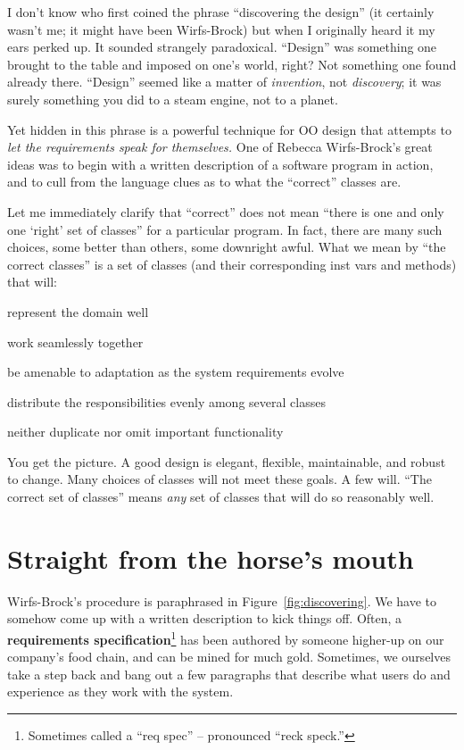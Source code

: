 I don't know who first coined the phrase ``discovering the design'' (it
certainly wasn't me; it might have been Wirfs-Brock) but when I originally
heard it my ears perked up. It sounded strangely paradoxical. ``Design'' was
something one brought to the table and imposed on one's world, right? Not
something one found already there. ``Design'' seemed like a matter of
\textit{invention}, not \textit{discovery}; it was surely something you did to
a steam engine, not to a planet.

Yet hidden in this phrase is a powerful technique for OO design that attempts
to \textit{let the requirements speak for themselves.} One of Rebecca
Wirfs-Brock's great ideas was to begin with a written description of a
software program in action, and to cull from the language clues as to what the
``correct'' classes are.

Let me immediately clarify that ``correct'' does not mean ``there is one and
only one `right' set of classes'' for a particular program. In fact, there are
many such choices, some better than others, some downright awful. What we
mean by ``the correct classes'' is a set of classes (and their corresponding
inst vars and methods) that will:

\begin{compactitem}
\item represent the domain well
\item work seamlessly together
\item be amenable to adaptation as the system requirements evolve
\item distribute the responsibilities evenly among several classes
\item neither duplicate nor omit important functionality
\end{compactitem}

You get the picture. A good design is elegant, flexible, maintainable, and
robust to change. Many choices of classes will not meet these goals. A few
will. ``The correct set of classes'' means \textit{any} set of classes that
will do so reasonably well.

\section{Straight from the horse's mouth}
\label{reqSpec}

Wirfs-Brock's procedure is paraphrased in Figure~\ref{fig:discovering}. We
have to somehow come up with a written description to kick things off. Often,
a \textbf{requirements specification}\footnote{Sometimes called a ``req spec''
-- pronounced ``reck speck.''} has been authored by someone higher-up on our
company's food chain, and can be mined for much gold. Sometimes, we ourselves
take a step back and bang out a few paragraphs that describe what users do and
experience as they work with the system.

